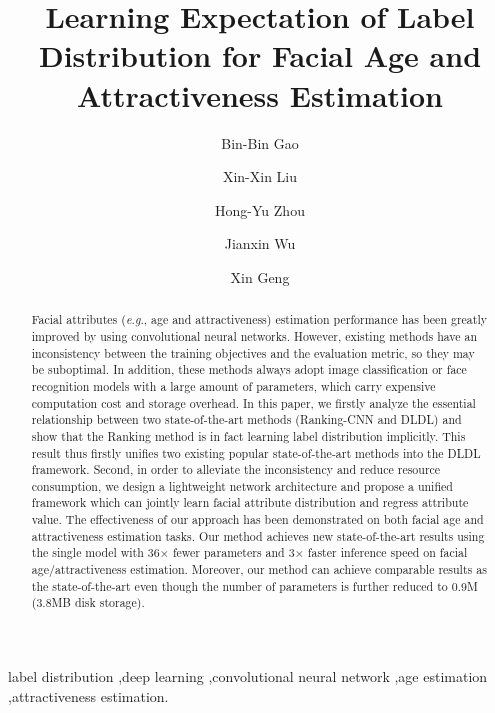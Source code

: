\documentclass[5p,times,twocolumn]{elsarticle}
\makeatletter
\DeclareRobustCommand\onedot{\@onedot}
\def\@onedot{.}
\def\eg{\emph{e.g}\onedot}
\makeatother
\begin{document}
\begin{frontmatter}

\title{Learning Expectation of Label Distribution for Facial Age and Attractiveness Estimation}

\author[youtu]{Bin-Bin Gao}

\author[nju]{Xin-Xin Liu}

\author[youtu]{Hong-Yu Zhou}

\author[nju]{Jianxin Wu}

\author[esu]{Xin Geng}

\address[youtu]{YouTu Lab, Tencent, Shenzhen 518075, China}
\address[nju]{National Key Laboratory for Novel Software Technology, Nanjing University, Nanjing 210023, China.}
\address[esu]{MOE Key Laboratory of Computer Network and Information Integration, Southeast University, Nanjing 211189, China}


\begin{abstract}
Facial attributes (\eg, age and attractiveness) estimation performance has been greatly improved by using convolutional neural networks. However, existing methods have an inconsistency between the training objectives and the evaluation metric, so they may be suboptimal. In addition, these methods always adopt image classification or face recognition models with a large amount of parameters, which carry expensive computation cost and storage overhead. In this paper, we firstly analyze the essential relationship between two state-of-the-art methods (Ranking-CNN and DLDL) and show that the Ranking method is in fact learning label distribution implicitly. This result thus firstly unifies two existing popular state-of-the-art methods into the DLDL framework. Second, in order to alleviate the inconsistency and reduce resource consumption, we design a lightweight network architecture and propose a unified framework which can jointly learn facial attribute distribution and regress attribute value. The effectiveness of our approach has been demonstrated on both facial age and attractiveness estimation tasks. Our method achieves new state-of-the-art results using the single model with 36$\times$ fewer parameters and 3$\times$ faster inference speed on facial age/attractiveness estimation. Moreover, our method can achieve comparable results as the state-of-the-art even though the number of parameters is further reduced to 0.9M (3.8MB disk storage).
\end{abstract}

\begin{keyword}
label distribution \sep deep learning \sep convolutional neural network \sep age estimation \sep attractiveness estimation.
\end{keyword}

\end{frontmatter}
\end{document}
